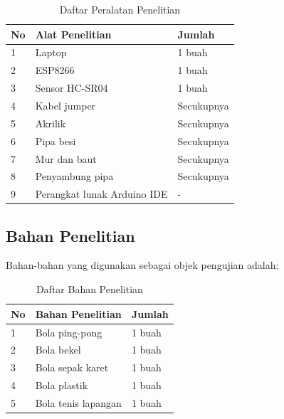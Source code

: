 \begin{table}[H]
\caption{Daftar Peralatan Penelitian}
\label{tab:alat}
\begin{center}
    \begin{tabular}{|l|l|l|}
    \hline
        \textbf{No} & \textbf{Alat Penelitian} & \textbf{Jumlah} \\\hline
        1 & Laptop & 1 buah \\\hline
        2 & ESP8266 & 1 buah \\\hline
        3 & Sensor HC-SR04 & 1 buah \\\hline
        4 & Kabel jumper & Secukupnya \\\hline
        5 & Akrilik & Secukupnya \\\hline
        6 & Pipa besi & Secukupnya \\\hline
        7 & Mur dan baut & Secukupnya \\\hline
        8 & Penyambung pipa & Secukupnya \\\hline
        9 & Perangkat lunak Arduino IDE & - \\\hline
    \end{tabular}
\end{center}
\end{table}

\subsection{Bahan Penelitian}
Bahan-bahan yang digunakan sebagai objek pengujian adalah:

\begin{table}[H]
\caption{Daftar Bahan Penelitian}
\label{tab:bahan}
\begin{center}
    \begin{tabular}{|l|l|l|}
    \hline
        \textbf{No} & \textbf{Bahan Penelitian} & \textbf{Jumlah} \\\hline
        1 & Bola ping-pong & 1 buah \\\hline
        2 & Bola bekel & 1 buah \\\hline
        3 & Bola sepak karet & 1 buah \\\hline
        4 & Bola plastik & 1 buah \\\hline
        5 & Bola tenis lapangan & 1 buah \\\hline
    \end{tabular}
\end{center}
\end{table}

